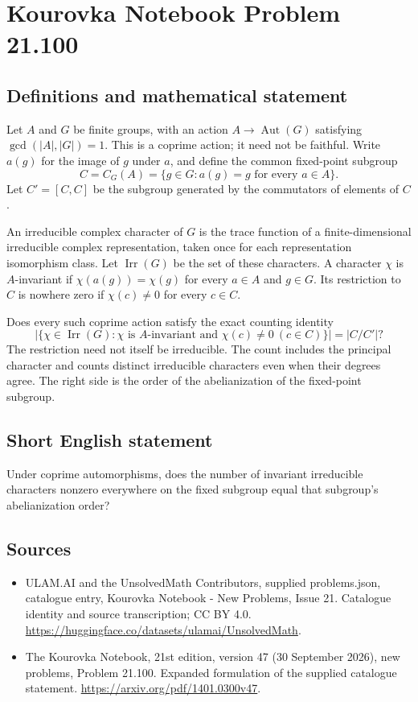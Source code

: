 \documentclass[11pt,a4paper]{article}
\begin{document}
\section*{Kourovka Notebook Problem 21.100}\label{statement}

\subsection{Definitions and mathematical statement}
Let $A$ and $G$ be finite groups, with an action $A\to\operatorname{Aut}(G)$ satisfying $\gcd(|A|,|G|)=1$. This is a coprime action; it need not be faithful. Write $a(g)$ for the image of $g$ under $a$, and define the common fixed-point subgroup
\[
 C=C_G(A)=\{g\in G:a(g)=g\text{ for every }a\in A\}.
\]
Let $C'=[C,C]$ be the subgroup generated by the commutators of elements of $C$.

An irreducible complex character of $G$ is the trace function of a finite-dimensional irreducible complex representation, taken once for each representation isomorphism class. Let $\operatorname{Irr}(G)$ be the set of these characters. A character $\chi$ is $A$-invariant if $\chi(a(g))=\chi(g)$ for every $a\in A$ and $g\in G$. Its restriction to $C$ is nowhere zero if $\chi(c)\ne0$ for every $c\in C$.

Does every such coprime action satisfy the exact counting identity
\[
 \left|\{\chi\in\operatorname{Irr}(G):
 \chi\text{ is }A\text{-invariant and }\chi(c)\ne0\ (c\in C)\}\right|
 =|C/C'|?
\]
The restriction need not itself be irreducible. The count includes the principal character and counts distinct irreducible characters even when their degrees agree. The right side is the order of the abelianization of the fixed-point subgroup.
\subsection{Short English statement}
Under coprime automorphisms, does the number of invariant irreducible characters nonzero everywhere on the fixed subgroup equal that subgroup’s abelianization order?
\subsection{Sources}
\begin{itemize}
\item[S1] ULAM.AI and the UnsolvedMath Contributors, supplied problems.json, catalogue entry, Kourovka Notebook - New Problems, Issue 21. Catalogue identity and source transcription; CC BY 4.0.
\url{https://huggingface.co/datasets/ulamai/UnsolvedMath}.
\item[S2] The Kourovka Notebook, 21st edition, version 47 (30 September 2026), new problems, Problem 21.100. Expanded formulation of the supplied catalogue statement.
\url{https://arxiv.org/pdf/1401.0300v47}.
\end{itemize}
\end{document}
